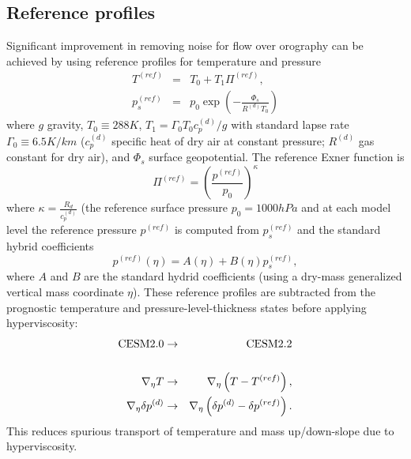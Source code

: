 \documentclass[draft]{agujournal2019}
\begin{document}
\subsection{Reference profiles}
Significant improvement in removing noise for flow over orography can be achieved by using reference profiles for temperature and pressure
\begin{eqnarray}
  T^{(ref)}&=&T_0+T_1 \Pi^{(ref)},\\
  p_s^{(ref)}&=&p_0\exp{\left(-\frac{\Phi_s}{R^{(d)}T_0}\right)}
\end{eqnarray}
\cite{SJ1991QJRMS} where $g$ gravity, $T_0\equiv 288K$, $T_1=\Gamma_0 T_0 c_p^{(d)}/g$ with standard lapse rate $\Gamma_0\equiv 6.5K/km$ ($c_p^{(d)}$ specific heat of dry air at constant pressure; $R^{(d)}$ gas constant for dry air), and $\Phi_s$ surface geopotential. The reference Exner function is
\begin{equation}
   \Pi^{(ref)}=\left( \frac{p^{(ref)}}{p_0}\right)^{\kappa}
\end{equation}
where $\kappa=\frac{R_d}{c_p^{(d)}}$ (the reference surface pressure $p_0=1000hPa$ and at each model level the reference pressure $p^{(ref)}$ is computed from $p_s^{(ref)}$ and the standard hybrid coefficients
\begin{equation}
    p^{(ref)}(\eta) = A(\eta)+B(\eta)p_s^{(ref)},
\end{equation}
where $A$ and $B$ are the standard hydrid coefficients (using a dry-mass generalized vertical mass coordinate $\eta$). These reference profiles are subtracted from the prognostic temperature and pressure-level-thickness states before applying hyperviscosity:
\begin{eqnarray*}
   \hbox{CESM2.0}&\rightarrow&\hbox{CESM2.2}\\
   && \\
  \nabla_\eta T &\rightarrow& \nabla_\eta \left(T-T^{(ref)}\right),\\ 
    \nabla_\eta \delta p^{(d)} &\rightarrow& \nabla_\eta \left(\delta p^{(d)}-\delta p^{(ref)}\right).
\end{eqnarray*}
This reduces spurious transport of temperature and mass up/down-slope due to hyperviscosity. 
\end{document}
